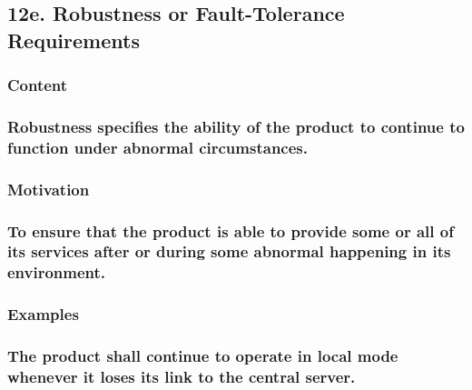 \documentclass[
]{article}
\begin{document}
\hypertarget{e.-robustness-or-fault-tolerance-requirements}{%
\subsection{12e. Robustness or Fault-Tolerance
Requirements}\label{e.-robustness-or-fault-tolerance-requirements}}

\hypertarget{content-41}{%
\subsubsection{Content}\label{content-41}}

\hypertarget{robustness-specifies-the-ability-of-the-product-to-continue-to-function-under-abnormal-circumstances.}{%
\subsubsection{Robustness specifies the ability of the product to
continue to function under abnormal
circumstances.}\label{robustness-specifies-the-ability-of-the-product-to-continue-to-function-under-abnormal-circumstances.}}

\hypertarget{motivation-40}{%
\subsubsection{Motivation}\label{motivation-40}}

\hypertarget{to-ensure-that-the-product-is-able-to-provide-some-or-all-of-its-services-after-or-during-some-abnormal-happening-in-its-environment.}{%
\subsubsection{\texorpdfstring{To ensure that the product is able to
provide some or all of its services after or during some abnormal
happening in its environment.
}{To ensure that the product is able to provide some or all of its services after or during some abnormal happening in its environment. }}\label{to-ensure-that-the-product-is-able-to-provide-some-or-all-of-its-services-after-or-during-some-abnormal-happening-in-its-environment.}}

\hypertarget{examples-25}{%
\subsubsection{Examples}\label{examples-25}}

\hypertarget{the-product-shall-continue-to-operate-in-local-mode-whenever-it-loses-its-link-to-the-central-server.}{%
\subsubsection{The product shall continue to operate in local mode
whenever it loses its link to the central
server.}\label{the-product-shall-continue-to-operate-in-local-mode-whenever-it-loses-its-link-to-the-central-server.}}
\end{document}

